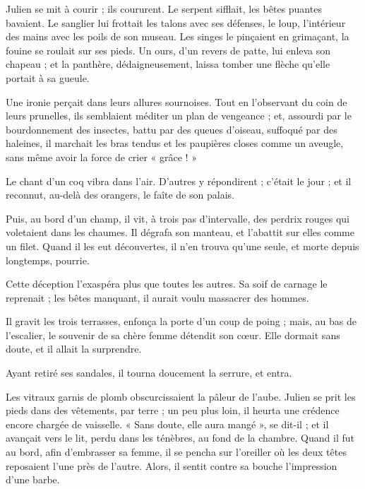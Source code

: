 \documentclass[]{book}
\begin{document}
                Julien se mit à courir ; ils coururent. Le serpent sifflait, les bêtes puantes bavaient. Le sanglier lui frottait les talons avec ses défenses, le loup, l'intérieur des mains avec les poils de son museau. Les singes le pinçaient en grimaçant, la fouine se roulait sur ses pieds. Un ours, d'un revers de patte, lui enleva son chapeau ; et la panthère, dédaigneusement, laissa tomber une flèche qu'elle portait à sa gueule.
                    
                Une ironie perçait dans leurs allures sournoises. Tout en l'observant du coin de leurs prunelles, ils semblaient méditer un plan de vengeance ; et, assourdi par le bourdonnement des insectes, battu par des queues d'oiseau, suffoqué par des haleines, il marchait les bras tendus et les paupières closes comme un aveugle, sans même avoir la force de crier « grâce ! »
                    
                Le chant d'un coq vibra dans l'air. D'autres y répondirent ; c'était le jour ; et il reconnut, au-delà des orangers, le faîte de son palais.
                    
                Puis, au bord d'un champ, il vit, à trois pas d'intervalle, des perdrix rouges qui voletaient dans les chaumes. Il dégrafa son manteau, et l'abattit sur elles comme un filet. Quand il les eut découvertes, il n'en trouva qu'une seule, et morte depuis longtemps, pourrie.
                    
                Cette déception l'exaspéra plus que toutes les autres. Sa soif de carnage le reprenait ; les bêtes manquant, il aurait voulu massacrer des hommes.
                    
                Il gravit les trois terrasses, enfonça la porte d'un coup de poing ; mais, au bas de l'escalier, le souvenir de sa chère femme détendit son cœur. Elle dormait sans doute, et il allait la surprendre.
                    
                Ayant retiré ses sandales, il tourna doucement la serrure, et entra.
                    
                Les vitraux garnis de plomb obscurcissaient la pâleur de l'aube. Julien se prit les pieds dans des vêtements, par terre ; un peu plus loin, il heurta une crédence encore chargée de vaisselle. « Sans doute, elle aura mangé », se dit-il ; et il avançait vers le lit, perdu dans les ténèbres, au fond de la chambre. Quand il fut au bord, afin d'embrasser sa femme, il se pencha sur l'oreiller où les deux têtes reposaient l'une près de l'autre. Alors, il sentit contre sa bouche l'impression d'une barbe.
                    
\end{document}
